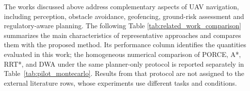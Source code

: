 \documentclass[electronics,article,submit,moreauthors]{Definitions/mdpi}
\DeclareRobustCommand{\deleted}[1]{}%
\DeclareRobustCommand{\added}[1]{#1}%
\DeclareRobustCommand{\deleted}[1]{\textcolor{black}{\sout{#1}}}
\DeclareRobustCommand{\added}[1]{\textcolor{green!50!black}{#1}}
\def\deleted#1{}%
\def\added#1{#1}%
\begin{document}
The works discussed \deleted{avobe}\added{above} address complementary aspects of UAV navigation, including perception, obstacle \deleted{avoidande}\added{avoidance}, geofencing, ground-risk \deleted{assesment}\added{assessment} and regulatory-aware planning. The following Table \ref{tab:related_work_comparison} summarizes the main characteristics of representative approaches and compares them with the proposed method. Its performance column identifies the quantities evaluated in this work; the homogeneous numerical comparison of PORCE, A*, RRT*, and DWA under the same planner-only protocol is reported separately in Table~\ref{tab:pilot_montecarlo}. Results from that protocol are not assigned to the external literature rows, whose experiments use different tasks and conditions.
\end{document}

